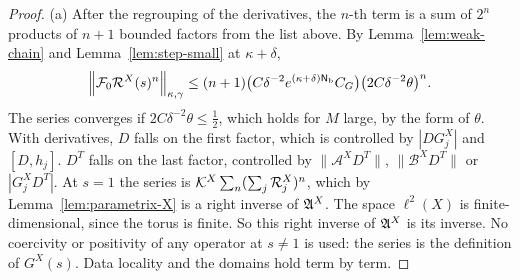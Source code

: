 \begin{proof}
(a) After the regrouping of the derivatives, the $n$-th term is a sum of $2^n$ products of $n+1$ bounded factors from the list above. By Lemma~\ref{lem:weak-chain} and Lemma~\ref{lem:step-small} at $\kappa+\delta$,
\[
\Big\|\mathcal F_0\mathcal R^X(s)^n\Big\|_{\kappa,\gamma}\le(n+1)\big(C\delta^{-2}e^{(\kappa+\delta)\mathsf N_{\rm b}}C_G\big)\big(2C\delta^{-2}\theta\big)^n .
\]
The series converges if $2C\delta^{-2}\theta\le\frac12$, which holds for $M$ large, by the form of $\theta$. With derivatives, $D$ falls on the first factor, which is controlled by $|DG^X_j|$ and $[D,h_j]$. $D^T$ falls on the last factor, controlled by $\|\mathcal A^XD^T\|$, $\|\mathcal B^XD^T\|$ or $|G^X_jD^T|$. At $s=1$ the series is $\mathcal K^X\sum_n(\sum_j\mathcal R^X_j)^n$, which by Lemma~\ref{lem:parametrix-X} is a right inverse of $\mathfrak A^X$. The space $\ell^2(X)$ is finite-dimensional, since the torus is finite. So this right inverse of $\mathfrak A^X$ is its inverse. No coercivity or positivity of any operator at $s\ne1$ is used: the series is the definition of $G^X(s)$. Data locality and the domains hold term by term.


\end{proof}
